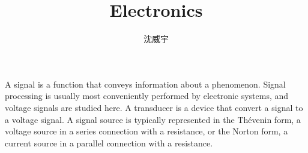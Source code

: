 \documentclass[a4paper,12pt]{article}
\begin{document}
\title{Electronics}
\author{沈威宇}
\date{\temtoday}
\titletocdoc
{}
A signal is a function that conveys information about a phenomenon. Signal processing is usually most conveniently performed by electronic systems, and voltage signals are studied here.
A transducer is a device that convert a signal to a voltage signal.
A signal source is typically represented in the Thévenin form, a voltage source in a series connection with a resistance, or the Norton form, a current source in a parallel connection with a resistance.
\end{document}
